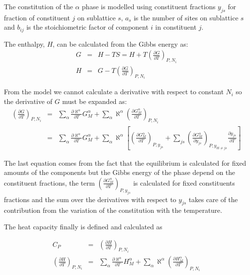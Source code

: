 \documentclass[12pt]{article}
\begin{document}
The constitution of the $\alpha$ phase is modelled using constituent
fractions $y_{js}$ for fraction of constituent $j$ on sublattice $s$,
$a_s$ is the number of sites on sublattice $s$ and $b_{ij}$ is the
stoichiometric factor of component $i$ in constituent $j$.

The enthalpy, $H$, can be calculated from the Gibbs energy as:
\begin{eqnarray}
G &=& H - TS = H + T\left(\frac{\partial G}{\partial T}\right)_{P,N_i}\\
H &=& G - T\left(\frac{\partial G}{\partial T}\right)_{P,N_i}
\end{eqnarray}

From the model we cannot calculate a derivative with respect to
constant $N_i$ so the derivative of $G$ must be expanded as:
\begin{eqnarray}
\left(\frac{\partial G}{\partial T}\right)_{P,N_i} &=& 
\sum_{\alpha}\frac{\partial \aleph^{\alpha}}{\partial T} G_M^{\alpha}+
\sum_{\alpha}\aleph^{\alpha}\left(\frac{\partial G_M^{\alpha}}{\partial T}\right)_{P,N_i}\nonumber\\&=&
\sum_{\alpha}\frac{\partial \aleph^{\alpha}}{\partial T} G_M^{\alpha}+
\sum_{\alpha}\aleph^{\alpha}\left[\left(\frac{\partial G_M^{\alpha}}{\partial T}\right)_{P,y_{js}}+
\sum_{js} \left(\frac{\partial G_M^{\alpha}}{\partial y_{js}}\right)_{P,y_{kt\ne js}} \frac{\partial y_{js}}{\partial T}\right]
\end{eqnarray}

The last equation comes from the fact that the equilibrium is
calculated for fixed amounts of the components but the Gibbs energy of
the phase depend on the constituent fractions, the term
$\left(\frac{\partial G_M^{\alpha}}{\partial T}\right)_{P,y_{js}}$ is
calculated for fixed constituents fractions and the sum over the
derivatives with respect to $y_{js}$ takes care of the contribution
from the variation of the constitution with the temperature.

The heat capacity finally is defined and calculated as

\begin{eqnarray}
C_P &=& \left(\frac{\partial H}{\partial T} \right)_{P,N_i}\\
\left(\frac{\partial H}{\partial T}\right)_{P,N_i} &=& 
\sum_{\alpha}\frac{\partial \aleph^{\alpha}}{\partial T} H_M^{\alpha}+
\sum_{\alpha}\aleph^{\alpha}\left(\frac{\partial H_M^{\alpha}}{\partial T}\right)_{P,N_i}
\end{eqnarray}
\end{document}
